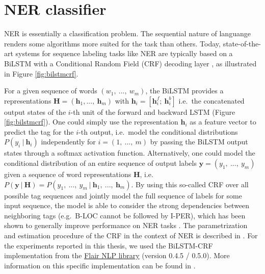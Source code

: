 \documentclass[12pt,a4paper,]{book}
\begin{document}
\newpage

\hypertarget{ner-classifier}{%
\section{NER classifier}\label{ner-classifier}}

NER is essentially a classification problem. The sequential nature of languange renders some algorithms more suited for the task than others. Today, state-of-the-art systems for sequence labeling tasks like NER are typically based on a BiLSTM with a Conditional Random Field (CRF) decoding layer \citep{lafferty2001}, as illustrated in Figure \ref{fig:bilstmcrf}.

For a given sequence of words \((w_1, \ ..., \ w_m)\), the BiLSTM provides a representations \(\mathbf{H} = (\mathbf{h}_1, ... , \ \mathbf{h}_m)\) with \(\mathbf{h}_i = [\mathbf{h}_i^f ; \ \mathbf{h}_i^b]\) i.e.~the concatenated output states of the \(i\)-th unit of the forward and backward LSTM (Figure \ref{fig:bilstmcrf}). One could simply use the representation \(\mathbf{h}_i\) as a feature vector to predict the tag for the \(i\)-th output, i.e.~model the conditional distributions \(P(y_i \ | \ \mathbf{h}_i)\) independently for \(i=(1, \ ..., \ m)\) by passing the BiLSTM output states through a softmax activation function. Alternatively, one could model the conditional distribution of an entire sequence of output labels \(\mathbf{y} = (y_1, \ ..., \ y_m)\) given a sequence of word representations \(\mathbf{H}\), i.e. \(P(\mathbf{y} \ | \ \mathbf{H}) = P(y_1, \ ..., \ y_m \ | \ \mathbf{h}_1, \ ..., \ \mathbf{h}_m )\). By using this so-called CRF over all possible tag sequences and jointly model the full sequence of labels for some input sequence, the model is able to consider the strong dependencies between neighboring tags (e.g.~B-LOC cannot be followed by I-PER), which has been shown to generally improve performance on NER tasks \citep{huang2015, reimers2017}. The parametrization and estimation procedure of the CRF in the context of NER is described in \citep{ma2016}. For the experiments reported in this thesis, we used the BiLSTM-CRF implementation from the \href{https://github.com/flairNLP/flair}{Flair NLP library} (version 0.4.5 / 0.5.0). More information on this specific implementation can be found in \citep{akbik2018, huang2015}.
\end{document}
